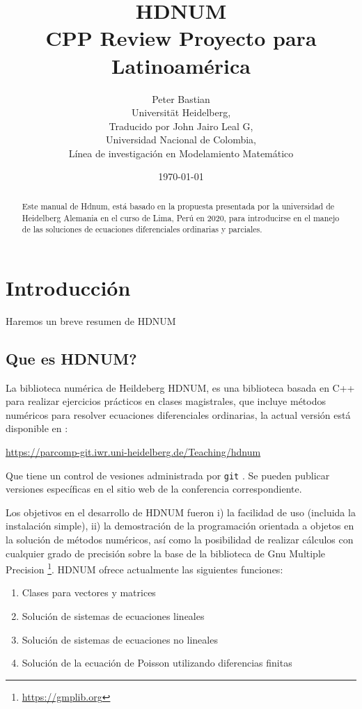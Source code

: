\documentclass[a4paper,11pt]{article}
\title{HDNUM\\ CPP Review Proyecto para Latinoamérica}
\author{Peter Bastian\\
  Universität Heidelberg, \\
  Traducido por John Jairo Leal G,\\
  Universidad Nacional de Colombia, \\
  Línea de investigación en Modelamiento Matemático\\
}
\date{\today}
\theoremstyle{definition}
\begin{document}
\maketitle



\begin{abstract}
Este manual de Hdnum, está basado en la propuesta presentada por la universidad de 
Heidelberg Alemania en el curso de Lima, Perú en 2020, para introducirse en el manejo de las soluciones de ecuaciones
diferenciales ordinarias y parciales.
\end{abstract}


\section{Introducción}
Haremos un breve resumen de HDNUM
\subsection{Que es HDNUM?}
La biblioteca numérica de Heildeberg HDNUM, es una biblioteca basada en C++ para realizar ejercicios prácticos en clases
magistrales, que incluye métodos numéricos para resolver ecuaciones diferenciales ordinarias, la actual versión está 
disponible en :
\begin{center}
\url{https://parcomp-git.iwr.uni-heidelberg.de/Teaching/hdnum}
\end{center}

Que tiene un control de vesiones administrada por \lstinline{git} .
Se pueden publicar versiones específicas en el sitio web de la conferencia correspondiente.

Los objetivos en el desarrollo de HDNUM fueron i) la facilidad de uso (incluida la instalación simple), ii) la demostración de la programación orientada a objetos en la solución de métodos numéricos, así como la posibilidad de realizar cálculos con cualquier grado de precisión sobre la base de la biblioteca de Gnu Multiple Precision \footnote{\url{https://gmplib.org}}. HDNUM ofrece actualmente las siguientes funciones:
\begin{enumerate}[1)]
\item Clases para vectores y matrices
\item Solución de sistemas de ecuaciones lineales
\item Solución de sistemas de ecuaciones no lineales
\item Solución de la ecuación de Poisson utilizando diferencias finitas
\end{enumerate}
\end{document}
